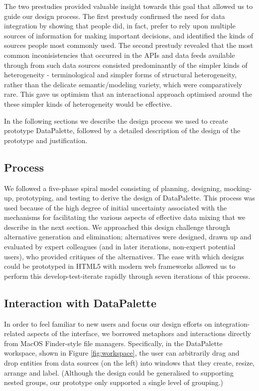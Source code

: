 \documentclass{sigchi}
\begin{document}
The two prestudies provided valuable insight towards this goal that allowed us to guide our design process. The first prestudy confirmed the need for data integration by showing that people did, in fact, prefer to rely upon multiple sources of information for making important decisions, and identified the kinds of sources people most commonly used.  The second prestudy revealed that the most common inconisistencies that occurred in the APIs and data feeds available through from such data sources consisted predominantly of the simpler kinds of heterogeneity - terminological and simpler forms of structural heterogeneity, rather than the delicate semantic/modeling variety, which were comparatively rare. This gave us optimism that an interactional approach optimised around the these simpler kinds of heterogeneity would be effective.

In the following sections we describe the design process we used to create prototype DataPalette, followed by a detailed description of the design of the prototype and justification.

\subsection{Process}
We followed a five-phase spiral model consisting of planning, designing, mocking-up, prototyping, and testing to derive the design of DataPalette.  This process was used because of the high degree of initial uncertainty associated with the mechanisms for facilitating the various aspects of effective data mixing that we describe in the next section. We approached this design challenge through alternative generation and elimination; alternatives were designed, drawn up and evaluated by expert colleagues (and in later iterations, non-expert potential users), who provided critiques of the alternatives. The ease with which designs could be prototyped in HTML5 with modern web frameworks allowed us to perform this develop-test-iterate rapidly through seven iterations of this process.

\subsection{Interaction with DataPalette}
In order to feel familiar to new users and focus our design efforts on integration-related aspects of the interface, we borrowed metaphors and interactions directly from MacOS Finder-style file managers.  Specifically, in the DataPalette workspace, shown in Figure \ref{fig:workspace}, the user can arbitrarily drag and drop entities from data sources (on the left) into windows that they create, resize, arrange and label. (Although the design could be generalised to supporting nested groups, our prototype only supported a single level of grouping.)
\end{document}
